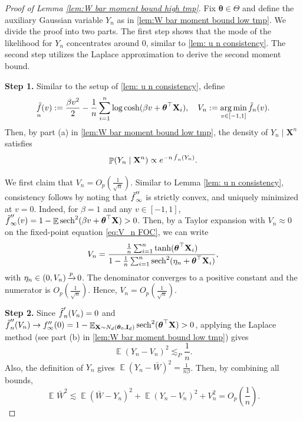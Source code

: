 \documentclass[preprint,reqno]{imsart}
\newcommand{\ttheta}{\boldsymbol{\theta}}
\newcommand{\I}{\mathbf{I}_{\mathnormal{d}}}
\DeclareMathOperator{\ft}{\tilde{\mathnormal f}}
\DeclareMathOperator{\QQCW}{\QQ_{\ttheta}^{\text{CW}}}
\DeclareMathOperator{\xp}{\xrightarrow{\mathnormal p}}
\DeclareMathOperator{\sech}{sech}
\DeclareMathOperator{\EE}{\mathbb{E}}
\DeclareMathOperator{\PP}{\mathbb{P}}
\DeclareMathOperator{\QQ}{\mathbb{Q}}
\newcommand{\X}{\mathbf{X}}
\DeclareMathOperator{\sumin}{\sum_{\mathnormal i=1}^{\mathnormal n}}
\DeclareMathOperator*{\argmin}{arg\,min}
\begin{document}
\begin{appendix}
\begin{proof}[Proof of Lemma \ref{lem:W bar moment bound high tmp}]

Fix $\ttheta \in \Theta$ and define the auxiliary Gaussian variable $Y_n$ as in \cref{lem:W bar moment bound low tmp}.
We divide the proof into two parts. The first step shows that the mode of the likelihood for $Y_n$ concentrates around $0$, similar to \cref{lem: u n consistency}. The second step utilizes the Laplace approximation to derive the second moment bound.
\vspace{2mm}

    \textbf{Step 1.} Similar to the setup of \cref{lem: u n consistency}, define $$\ft_n(v) := \frac{\beta v^2}{2} - \frac{1}{n} \sumin \log \cosh(\beta v + \ttheta^\top \X_i), \quad V_n := \argmin_{v \in [-1,1]} \tilde{f}_n(v).$$ Then, by part (a) in \cref{lem:W bar moment bound low tmp}, the density of $Y_n \mid \X^n$ satisfies
    $$\PP(Y_n \mid \X^n) \propto e^{-n \ft_n(Y_n)}.$$
    
    We first claim that $V_n = O_p(\frac{1}{\sqrt{n}})$. Similar to Lemma \ref{lem: u n consistency}, consistency follows by noting that $\ft_{\infty}''$ is strictly convex, and uniquely minimized at $v = 0$. Indeed, for $\beta = 1$ and any $v \in [-1,1]$, $\ft_{\infty}''(v) = 1 - \EE \sech^2(\beta v + \ttheta^\top \X) > 0$. Then, by a Taylor expansion with $V_n \approx 0$ on the fixed-point equation \eqref{eq:V_n FOC}, we can write
    $$V_n = \frac{\frac{1}{n} \sumin \tanh(\ttheta^\top \X_i)}{1 - \frac{1}{n} \sumin \sech^2(\eta_n + \ttheta^\top \X_i)},$$
    with $\eta_n \in (0, V_n) \xp 0$. The denominator converges to a positive constant and the numerator is $O_p(\frac{1}{\sqrt{n}})$. Hence, $V_n = O_p(\frac{1}{\sqrt{n}})$.

    \vspace{2mm}
    \textbf{Step 2.} %
    Since $\ft'_n(V_n) = 0$ and $\ft''_n (V_n) \to f_{\infty}''(0) = 1 - \EE_{\X \sim N_d(\ttheta_0, \I)} \sech^2(\ttheta^\top \X) > 0$, applying the Laplace method (see part (b) in \cref{lem:W bar moment bound low tmp}) gives
    $$\EE (Y_n - V_n)^2 \lesssim_P \frac{1}{n}.$$
    Also, the definition of $Y_n$ gives $\EE(Y_n - \bar{W})^2 = \frac{1}{n\beta}$.
    Then, by combining all bounds,
    $$\EE^{\QQCW} \bar{W}^2 \lesssim \EE (\bar{W} - Y_n)^2 + \EE (Y_n - V_n)^2 + V_n^2 = O_p\left(\frac{1}{n} \right).$$
\end{proof}



\end{appendix}
\end{document}
